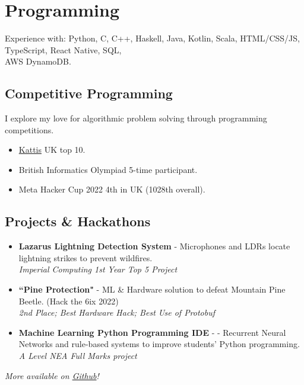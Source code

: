 \documentclass{Resume}
\begin{document}
		\newpage
	\section{Programming}
			Experience with: Python, C, C++, Haskell, Java, Kotlin, Scala, HTML/CSS/JS, TypeScript, React Native, SQL, \\AWS DynamoDB.
   
		\subsection{Competitive Programming}
			I explore my love for algorithmic problem solving through programming competitions. 
			\begin{itemize}
			    \item \href{https://open.kattis.com/countries/GBR}{Kattis} UK top 10.
			    \item British Informatics Olympiad 5-time participant.
			    \item Meta Hacker Cup 2022 4th in UK (1028th overall).

			    
			\end{itemize}
		\subsection{Projects \& Hackathons}
			\begin{itemize}
   
            \item \textbf{Lazarus Lightning Detection System} - Microphones and LDRs locate lightning strikes to prevent wildfires.\\ \textit{Imperial Computing 1st Year Top 5 Project}
            
            \item \textbf{``Pine Protection"} - ML \& Hardware solution to defeat Mountain Pine Beetle. (Hack the 6ix 2022)\\ 
            \textit{2nd Place; Best Hardware Hack; Best Use of Protobuf}

            \item \textbf{Machine Learning Python Programming IDE} - - Recurrent Neural Networks and rule-based systems to improve students' Python programming. \\ \textit{A Level NEA Full Marks project}


    
				
			\end{itemize}
    \textit{More available on \href{https://github.com/starswap}{Github}!}
    
\end{document}
